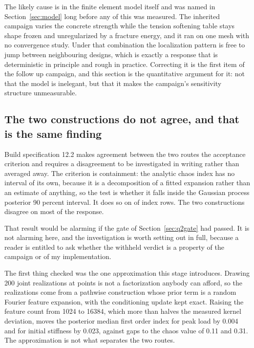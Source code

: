 \documentclass[11pt,a4paper]{article}
\begin{document}
The likely cause is in the finite element model itself and was named in
Section~\ref{sec:model} long before any of this was measured. The inherited campaign varies the
concrete strength while the tension softening table stays shape frozen and unregularized by a
fracture energy, and it ran on one mesh with no convergence study. Under that combination the
localization pattern is free to jump between neighbouring designs, which is exactly a response
that is deterministic in principle and rough in practice. Correcting it is the first item of
the follow up campaign, and this section is the quantitative argument for it: not that the
model is inelegant, but that it makes the campaign's sensitivity structure unmeasurable.

\subsection{The two constructions do not agree, and that is the same finding}
\label{sec:sensagreement}
Build specification 12.2 makes agreement between the two routes the acceptance criterion and
requires a disagreement to be investigated in writing rather than averaged away. The criterion
is containment: the analytic chaos index has no interval of its own, because it is a
decomposition of a fitted expansion rather than an estimate of anything, so the test is whether
it falls inside the Gaussian process posterior 90 percent interval. It does so on
\SensAgreeCount{} of \SensAgreeRows{} index rows. The two constructions disagree on most of
the response.

That result would be alarming if the gate of Section~\ref{sec:q2gate} had passed. It is not
alarming here, and the investigation is worth setting out in full, because a reader is entitled
to ask whether the withheld verdict is a property of the campaign or of my implementation.

The first thing checked was the one approximation this stage introduces. Drawing 200 joint
realizations at \SensDesignRows{} points is not a factorization anybody can afford, so the
realizations come from a pathwise construction whose prior term is a random Fourier feature
expansion, with the conditioning update kept exact. Raising the feature count from 1024 to
16384, which more than halves the measured kernel deviation, moves the posterior median first
order index for peak load by 0.004 and for initial stiffness by 0.023, against gaps to the
chaos value of 0.11 and 0.31. The approximation is not what separates the two routes.
\end{document}

